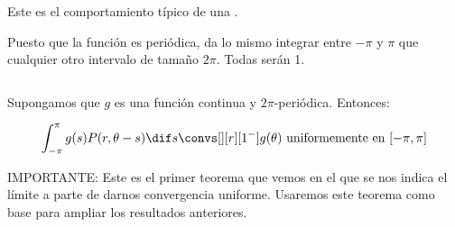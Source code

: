 \begin{prop}
\begin{itemize}
			Este es el comportamiento típico de una .

			\begin{center}
			\end{center}

			\noindent Puesto que la función es periódica, da lo mismo integrar entre $-\pi$ y $\pi$ que cualquier otro intervalo de tamaño $2\pi$. Todas serán 1.

		\end{itemize}
		\end{prop}

		\begin{theorem} \label{thm:ConvUniformePoisson}
			$ $ %

			\noindent Supongamos que $g$ es una función continua y $2\pi$-periódica. Entonces:

			\[ \int^\pi_{-\pi} g(s)P(r, \theta-s) \dif s \convs[][r][1^-] g(\theta) \text{ uniformemente en } [-\pi,\pi] \]

			IMPORTANTE: Este es el primer teorema que vemos en el que se nos indica el límite a parte de darnos convergencia uniforme. Usaremos este teorema como base para ampliar los resultados anteriores.
		\end{theorem}

